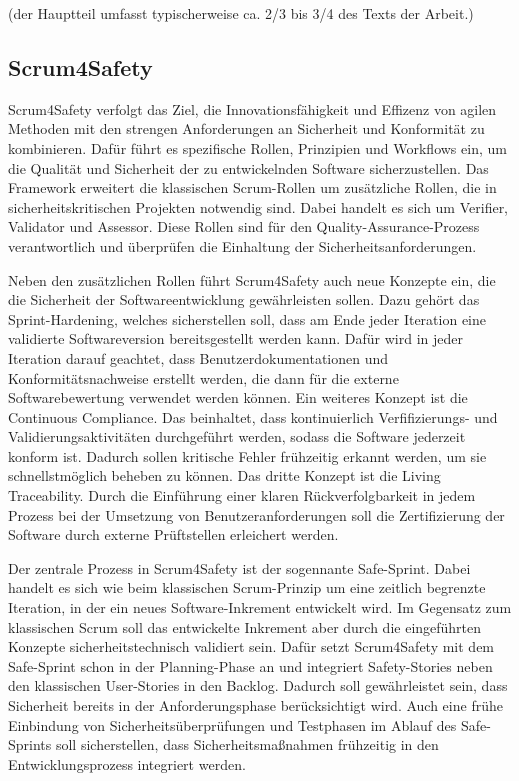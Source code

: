 \documentclass[acmtog]{acmart}
\begin{document}
(der Hauptteil umfasst typischerweise ca. 2/3 bis 3/4 des Texts der Arbeit.)

\subsection{Scrum4Safety}

Scrum4Safety verfolgt das Ziel, die Innovationsfähigkeit und Effizenz von agilen Methoden mit den strengen Anforderungen an Sicherheit und Konformität zu kombinieren.
Dafür führt es spezifische Rollen, Prinzipien und Workflows ein, um die Qualität und Sicherheit der zu entwickelnden Software sicherzustellen. Das Framework
erweitert die klassischen Scrum-Rollen um zusätzliche Rollen, die in sicherheitskritischen Projekten notwendig sind. Dabei handelt es sich um Verifier, Validator und Assessor.
Diese Rollen sind für den Quality-Assurance-Prozess verantwortlich und überprüfen die Einhaltung der Sicherheitsanforderungen. 

Neben den zusätzlichen Rollen führt Scrum4Safety auch neue Konzepte ein, die die Sicherheit der Softwareentwicklung gewährleisten sollen. Dazu gehört das Sprint-Hardening,
welches sicherstellen soll, dass am Ende jeder Iteration eine validierte Softwareversion bereitsgestellt werden kann. Dafür wird in jeder Iteration darauf geachtet, 
dass Benutzerdokumentationen und Konformitätsnachweise erstellt werden, die dann für die externe Softwarebewertung verwendet werden können. 
Ein weiteres Konzept ist die Continuous Compliance. Das beinhaltet, dass kontinuierlich Verfifizierungs- und Validierungsaktivitäten durchgeführt werden, sodass die Software
jederzeit konform ist. Dadurch sollen kritische Fehler frühzeitig erkannt werden, um sie schnellstmöglich beheben zu können. Das dritte Konzept ist die Living Traceability.
Durch die Einführung einer klaren Rückverfolgbarkeit in jedem Prozess bei der Umsetzung von Benutzeranforderungen soll die Zertifizierung 
der Software durch externe Prüftstellen erleichert werden. \cite{andriadi_impact_2023}

Der zentrale Prozess in Scrum4Safety ist der sogennante Safe-Sprint. Dabei handelt es sich wie beim klassischen Scrum-Prinzip um eine zeitlich begrenzte Iteration, in 
der ein neues Software-Inkrement entwickelt wird. Im Gegensatz zum klassischen Scrum soll das entwickelte Inkrement aber durch die eingeführten Konzepte sicherheitstechnisch
validiert sein. Dafür setzt Scrum4Safety mit dem Safe-Sprint schon in der Planning-Phase an und integriert Safety-Stories neben den klassischen User-Stories in den Backlog.
Dadurch soll gewährleistet sein, dass Sicherheit bereits in der Anforderungsphase berücksichtigt wird. Auch eine frühe Einbindung von Sicherheitsüberprüfungen und Testphasen im Ablauf 
des Safe-Sprints soll sicherstellen, dass Sicherheitsmaßnahmen frühzeitig in den Entwicklungsprozess integriert werden. 
\end{document}
